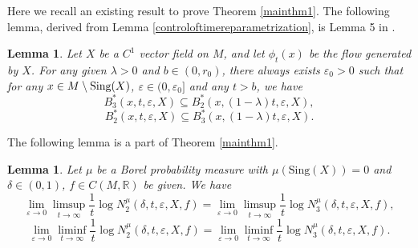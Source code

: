 \documentclass[10pt]{article}
\newtheorem*{Theorem A}{Theorem A}
\newtheorem{Lemma}[Theorem]{Lemma}
\begin{document}
Here we recall an existing result to prove Theorem \ref{mainthm1}. The following lemma, derived from Lemma \ref{controloftimereparametrization}, is Lemma 5 in \cite{WANG2024128673}.

\begin{Lemma}\label{lemma3.1}
Let \( X \) be a \( C^1 \) vector field on \( M \), and let \( \phi_t(x) \) be the flow generated by \( X \). For any given \( \lambda > 0 \) and \( b \in (0, r_0) \), there always exists \( \varepsilon_0 > 0 \) such that for any \( x \in M \setminus \text{\rm Sing}(X) \), \( \varepsilon \in (0, \varepsilon_0] \) and any $t>b$, we have
\[
B_3^*(x, t, \varepsilon, X) \subseteq B_2^*(x, (1 - \lambda)t, \varepsilon, X),
\]
\[
B_2^*(x, t, \varepsilon, X) \subseteq B_3^*(x, (1 - \lambda)t, \varepsilon, X).
\]
\end{Lemma}

The following lemma is a part of Theorem \ref{mainthm1}.

\begin{Lemma}\label{lemma3.2}
Let $\mu$ be a Borel probability measure with $\mu(\text{Sing}(X)) = 0$ and $\delta \in (0, 1)$, $f \in C(M, \mathbb{R})$ be given. We have
\[
\lim_{\varepsilon \to 0} \limsup_{t \to \infty} \frac{1}{t} \log N_2^\mu(\delta, t, \varepsilon, X, f) = \lim_{\varepsilon \to 0} \limsup_{t \to \infty} \frac{1}{t} \log N_3^\mu(\delta, t, \varepsilon, X, f),
\]
\[
\lim_{\varepsilon \to 0} \liminf_{t \to \infty} \frac{1}{t} \log N_2^\mu(\delta, t, \varepsilon, X, f) = \lim_{\varepsilon \to 0} \liminf_{t \to \infty} \frac{1}{t} \log N_3^\mu(\delta, t, \varepsilon, X, f).
\]
\end{Lemma}
\end{document}
